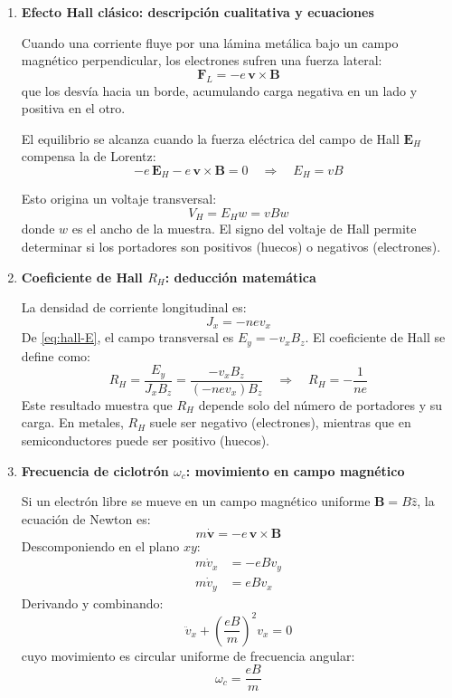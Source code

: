 \documentclass{article}
\begin{document}
\begin{enumerate}[label=\textbf{Actividad \arabic*.}, leftmargin=*]
\item \textbf{Efecto Hall clásico: descripción cualitativa y ecuaciones}

Cuando una corriente fluye por una lámina metálica bajo un campo magnético perpendicular, los electrones sufren una fuerza lateral:
\[
\mathbf{F}_L = -e\,\mathbf{v}\times\mathbf{B}
\]
que los desvía hacia un borde, acumulando carga negativa en un lado y positiva en el otro.

El equilibrio se alcanza cuando la fuerza eléctrica del campo de Hall \(\mathbf{E}_H\) compensa la de Lorentz:
\begin{equation}
-e\,\mathbf{E}_H - e\,\mathbf{v}\times\mathbf{B} = 0
\quad\Rightarrow\quad
\boxed{E_H = vB}
\label{eq:hall-E}
\end{equation}

Esto origina un voltaje transversal:
\[
V_H = E_H w = v B w
\]
donde \(w\) es el ancho de la muestra.  
El signo del voltaje de Hall permite determinar si los portadores son positivos (huecos) o negativos (electrones).

\item \textbf{Coeficiente de Hall \(R_H\): deducción matemática}

La densidad de corriente longitudinal es:
\[
J_x = -n e v_x
\]
De \eqref{eq:hall-E}, el campo transversal es \(E_y = -v_x B_z\).
El coeficiente de Hall se define como:
\begin{equation}
R_H = \frac{E_y}{J_x B_z}
= \frac{-v_x B_z}{(-n e v_x) B_z}
\quad\Rightarrow\quad
\boxed{R_H = -\frac{1}{n e}}
\label{eq:RH}
\end{equation}
Este resultado muestra que \(R_H\) depende solo del número de portadores y su carga.  
En metales, \(R_H\) suele ser negativo (electrones), mientras que en semiconductores puede ser positivo (huecos).

\item \textbf{Frecuencia de ciclotrón \(\omega_c\): movimiento en campo magnético}

Si un electrón libre se mueve en un campo magnético uniforme \(\mathbf{B} = B\hat{z}\),
la ecuación de Newton es:
\[
m\dot{\mathbf{v}} = -e\,\mathbf{v}\times\mathbf{B}
\]
Descomponiendo en el plano \(xy\):
\begin{align*}
m\dot{v}_x &= -e B v_y \\
m\dot{v}_y &= e B v_x
\end{align*}
Derivando y combinando:
\[
\ddot{v}_x + \left(\frac{eB}{m}\right)^2 v_x = 0
\]
cuyo movimiento es circular uniforme de frecuencia angular:
\begin{equation}
\boxed{\omega_c = \frac{eB}{m}}
\label{eq:wc}
\end{equation}


\end{enumerate}
\end{document}

